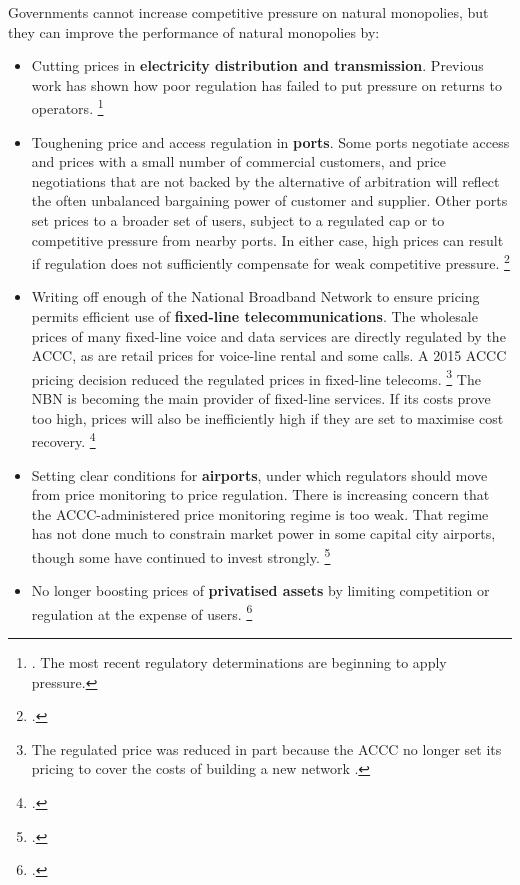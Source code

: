 Governments cannot increase competitive pressure on natural monopolies, but they can improve the performance of natural monopolies by:
\begin{itemize}
\item Cutting prices in \textbf{electricity distribution and transmission}. Previous work has shown how poor regulation has failed to put pressure on returns to operators.%
\footnote{\textcites{WoodHunterOTooleEtAl2012}{AERdeterminations}. The most recent regulatory determinations are beginning to apply pressure.}
\item Toughening price and access regulation in \textbf{ports}. Some ports negotiate access and prices with a small number of commercial customers, and price negotiations that are not backed by the alternative of arbitration will reflect the often unbalanced bargaining power of customer and supplier. Other ports set prices to a broader set of users, subject to a regulated cap or to competitive pressure from nearby ports. In either case, high prices can result if regulation does not sufficiently compensate for weak competitive pressure.%
\footcites{ACCC-ports-reg-2016}{Vic-port-reg-2015}{QLD-ports-2017}{ESC-ports-2014}
\item Writing off enough of the National Broadband Network to ensure pricing permits efficient use of \textbf{fixed-line telecommunications}. The wholesale prices of many fixed-line voice and data services are directly regulated by the ACCC, as are retail prices for voice-line rental and some calls. A 2015 ACCC pricing decision reduced the regulated prices in fixed-line telecoms.%
\footnote{The regulated price was reduced in part because the ACCC no longer set its pricing to cover the costs of building a new network \parencite{ACCC_fixedlineprice_2015}.}  
The NBN is becoming the main provider of fixed-line services. If its costs prove too high, prices will also be inefficiently high if they are set to maximise cost recovery.%
\footcite{ACCCCommsMarketStudyDraft2017}
\item Setting clear conditions for \textbf{airports}, under which regulators should move from price monitoring to price regulation. There is increasing concern that the ACCC-administered price monitoring regime is too weak. That regime has not done much to constrain market power in some capital city airports, though some have continued to invest strongly.%
\footcites{PC-airport-2012}{ACCC_Airports_2015-16}{ABC_sims-airport_2017}
\item No longer boosting prices of \textbf{privatised assets} by limiting competition or regulation at the expense of users.%
\footcite{ACCC_privatise_smart_2016}
\end{itemize}


